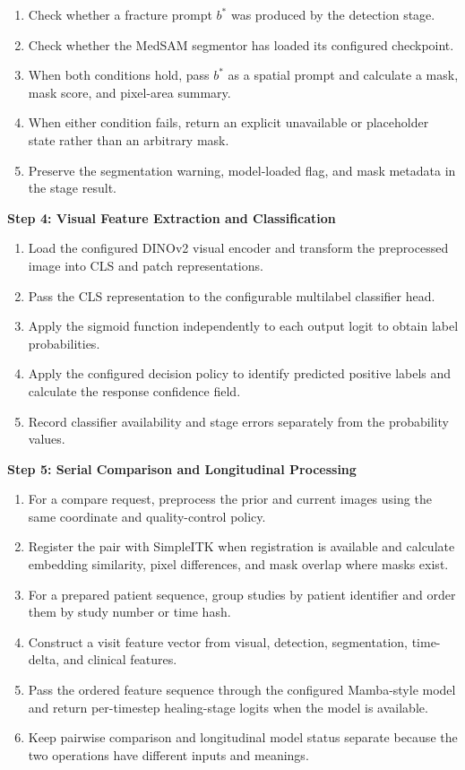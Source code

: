 \documentclass[12pt,a4paper]{article}
\begin{document}
\begin{enumerate}[leftmargin=30pt,label=3.\arabic*]
\item Check whether a fracture prompt $b^*$ was produced by the detection stage.
\item Check whether the MedSAM segmentor has loaded its configured checkpoint.
\item When both conditions hold, pass $b^*$ as a spatial prompt and calculate a mask, mask score, and pixel-area summary.
\item When either condition fails, return an explicit unavailable or placeholder state rather than an arbitrary mask.
\item Preserve the segmentation warning, model-loaded flag, and mask metadata in the stage result.
\end{enumerate}

\textbf{Step 4: Visual Feature Extraction and Classification}

\begin{enumerate}[leftmargin=30pt,label=4.\arabic*]
\item Load the configured DINOv2 visual encoder and transform the preprocessed image into CLS and patch representations.
\item Pass the CLS representation to the configurable multilabel classifier head.
\item Apply the sigmoid function independently to each output logit to obtain label probabilities.
\item Apply the configured decision policy to identify predicted positive labels and calculate the response confidence field.
\item Record classifier availability and stage errors separately from the probability values.
\end{enumerate}

\textbf{Step 5: Serial Comparison and Longitudinal Processing}

\begin{enumerate}[leftmargin=30pt,label=5.\arabic*]
\item For a compare request, preprocess the prior and current images using the same coordinate and quality-control policy.
\item Register the pair with SimpleITK when registration is available and calculate embedding similarity, pixel differences, and mask overlap where masks exist.
\item For a prepared patient sequence, group studies by patient identifier and order them by study number or time hash.
\item Construct a visit feature vector from visual, detection, segmentation, time-delta, and clinical features.
\item Pass the ordered feature sequence through the configured Mamba-style model and return per-timestep healing-stage logits when the model is available.
\item Keep pairwise comparison and longitudinal model status separate because the two operations have different inputs and meanings.
\end{enumerate}
\end{document}
